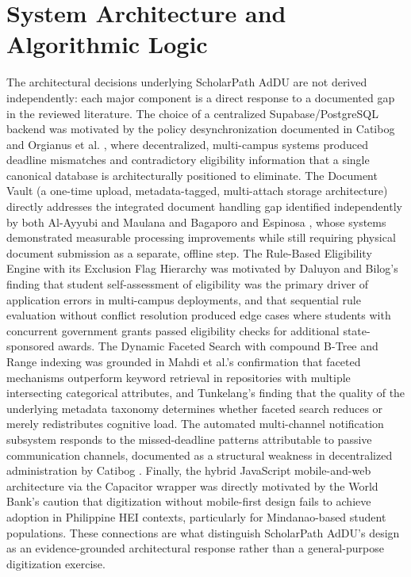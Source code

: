 \section{System Architecture and Algorithmic Logic}

The architectural decisions underlying ScholarPath AdDU are not derived independently: each major component is a direct response to a documented gap in the reviewed literature. The choice of a centralized Supabase/PostgreSQL backend was motivated by the policy desynchronization documented in Catibog \cite{ref16} and Orgianus et al. \cite{ref36}, where decentralized, multi-campus systems produced deadline mismatches and contradictory eligibility information that a single canonical database is architecturally positioned to eliminate. The Document Vault (a one-time upload, metadata-tagged, multi-attach storage architecture) directly addresses the integrated document handling gap identified independently by both Al-Ayyubi and Maulana \cite{ref3} and Bagaporo and Espinosa \cite{ref12}, whose systems demonstrated measurable processing improvements while still requiring physical document submission as a separate, offline step. The Rule-Based Eligibility Engine with its Exclusion Flag Hierarchy was motivated by Daluyon and Bilog's \cite{ref14} finding that student self-assessment of eligibility was the primary driver of application errors in multi-campus deployments, and that sequential rule evaluation without conflict resolution produced edge cases where students with concurrent government grants passed eligibility checks for additional state-sponsored awards. The Dynamic Faceted Search with compound B-Tree and Range indexing was grounded in Mahdi et al.'s \cite{ref4} confirmation that faceted mechanisms outperform keyword retrieval in repositories with multiple intersecting categorical attributes, and Tunkelang's \cite{ref43} finding that the quality of the underlying metadata taxonomy determines whether faceted search reduces or merely redistributes cognitive load. The automated multi-channel notification subsystem responds to the missed-deadline patterns attributable to passive communication channels, documented as a structural weakness in decentralized administration by Catibog \cite{ref16}. Finally, the hybrid JavaScript mobile-and-web architecture via the Capacitor wrapper was directly motivated by the World Bank's \cite{ref48} caution that digitization without mobile-first design fails to achieve adoption in Philippine HEI contexts, particularly for Mindanao-based student populations. These connections are what distinguish ScholarPath AdDU's design as an evidence-grounded architectural response rather than a general-purpose digitization exercise.

